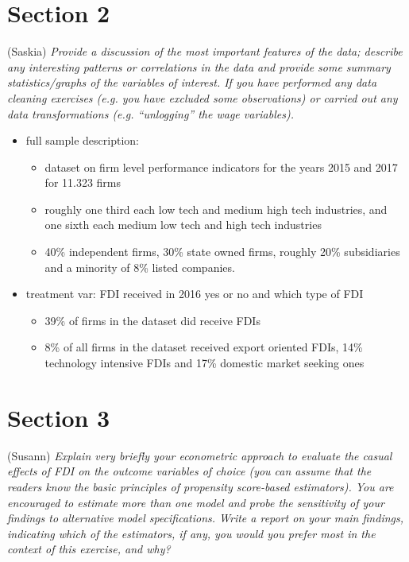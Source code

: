 \documentclass[11pt,a4paper,leqno]{article}
\begin{document}
\section*{Section 2} (Saskia)
\textit{Provide a discussion of the most important features of the data; describe any interesting patterns or correlations in the data and provide some summary statistics/graphs of the variables of interest. If you have performed any data cleaning exercises (e.g. you have excluded some observations) or carried out any data transformations (e.g. “unlogging” the wage variables).}

\begin{itemize}
	\item full sample description:
	\begin{itemize}
		\item dataset on firm level performance indicators for the years 2015 and 2017 for 11.323 firms  
		\item roughly one third each low tech and medium high tech industries, and one sixth each medium low tech and high tech industries
		\item 40\% independent firms, 30\% state owned firms, roughly 20\% subsidiaries and a minority of 8\% listed companies.  
	\end{itemize}
	\item treatment var: FDI received in 2016 yes or no and which type of FDI
	\begin{itemize}
		\item 39\% of firms in the dataset did receive FDIs
		\item 8\% of all firms in the dataset received export oriented FDIs, 14\% technology intensive FDIs and 17\% domestic market seeking ones
	\end{itemize}

\end{itemize}

\section*{Section 3} (Susann)
\textit{Explain very briefly your econometric approach to evaluate the casual effects of FDI on the outcome variables of choice (you can assume that the readers know the basic principles of propensity score-based estimators). You are encouraged to estimate more than one model and probe the sensitivity of your findings to alternative model specifications. Write a report on your main findings, indicating which of the estimators, if any, you would you prefer most in the context of this exercise, and why?}
\end{document}
